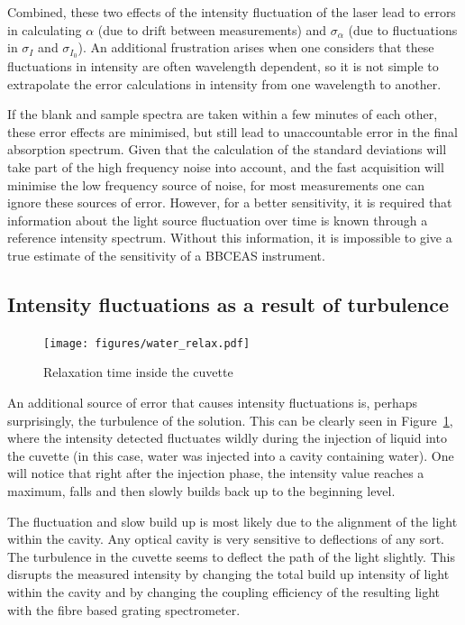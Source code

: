 Combined, these two effects of the intensity fluctuation of the laser lead
to errors in calculating $\alpha$ (due to drift between measurements) and
$\sigma_{\alpha}$ (due to fluctuations in $\sigma_{I}$ and $\sigma_{I_0}$). An
additional frustration arises when one considers that these fluctuations in
intensity are often wavelength dependent, so it is not simple to extrapolate
the error calculations in intensity from one wavelength to another.

If the blank and sample spectra are taken within a few minutes of each other,
these error effects are minimised, but still lead to unaccountable error in
the final absorption spectrum. Given that the calculation of the standard
deviations will take part of the high frequency noise into account, and
the fast acquisition will minimise the low frequency source of noise, for
most measurements one can ignore these sources of error. However, for a
better sensitivity, it is required that information about the light source
fluctuation over time is known through a reference intensity spectrum. Without
this information, it is impossible to give a true estimate of the sensitivity
of a \ac{BBCEAS} instrument.

\subsection{Intensity fluctuations as a result of turbulence}

\begin{figure}
\begin{center}
\texttt{[image: figures/water\_relax.pdf]}
\end{center}
\caption{Relaxation time inside the cuvette}
\label{fig:relax}
\end{figure}

An additional source of error that causes intensity fluctuations is, perhaps
surprisingly, the turbulence of the solution. This can be clearly seen in
Figure~\ref{fig:relax}, where the intensity detected fluctuates wildly
during the injection of liquid into the cuvette (in this case, water was
injected into a cavity containing water). One will notice that right after the
injection phase, the intensity value reaches a maximum, falls and then slowly
builds back up to the beginning level.

The fluctuation and slow build up is most likely due to the alignment of the
light within the cavity. Any optical cavity is very sensitive to deflections
of any sort. The turbulence in the cuvette seems to deflect the path of the
light slightly. This disrupts the measured intensity by changing the total
build up intensity of light within the cavity and by changing the coupling
efficiency of the resulting light with the fibre based grating spectrometer.

